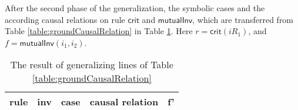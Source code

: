 \documentclass[conference]{IEEEtran}
\def \eqc {\doteq }
\def \negc {!}
\def \iInv {i}
\def \iR {iR}
\begin{document}
{%

After the second phase of the generalization, the symbolic cases and the according causal relations on rule $\mathsf{crit}$ and $\mathsf{mutualInv}$, which are transferred from Table \ref{table:groundCausalRelation} in  Table \ref{table:symbCausalRelation}. Here $r=\mathsf{crit}(\iR_1)$, and $f=\mathsf{mutualInv}(\iInv_1,\iInv_2)$. %

\begin{table}[htbp]
\centering \caption{The result of generalizing lines of Table \ref{table:groundCausalRelation} \label{table:symbCausalRelation}} %
\vspace{-8pt}
\begin{tabular}{|c|c|c|c|c|  }
\hline
  rule&inv&case & causal relation &   f'  \\
\hline


\end{tabular}
\end{table}}
\end{document}
